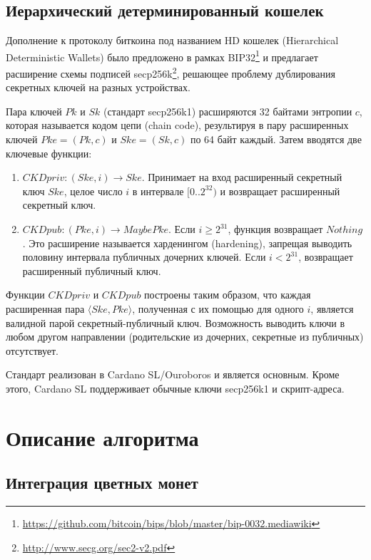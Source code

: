 \documentclass[]{itmo-student-thesis}
\begin{document}
\section{Иерархический детерминированный кошелек}

Дополнение к протоколу биткоина под названием HD кошелек (Hierarchical
Deterministic Wallets) было предложено в рамках
BIP32\footnote{\url{https://github.com/bitcoin/bips/blob/master/bip-0032.mediawiki}}
и предлагает расширение схемы подписей
secp256k\footnote{\url{http://www.secg.org/sec2-v2.pdf}}, решающее
проблему дублирования секретных ключей на разных устройствах.

Пара ключей $Pk$ и $Sk$ (стандарт secp256k1) расширяются 32 байтами
энтропии $c$, которая называется кодом цепи (chain code), результируя
в пару расширенных ключей $Pke = (Pk, c)$ и $Ske = (Sk, c)$ по 64 байт
каждый. Затем вводятся две ключевые функции:

\begin{enumerate}
\item $CKDpriv : (Ske, i) \rightarrow Ske$. Принимает на вход расширенный
  секретный ключ $Ske$, целое число $i$ в интервале $[0..2^{32})$ и
  возвращает расширенный секретный ключ.
\item $CKDpub : (Pke, i) \rightarrow Maybe Pke$. Если $i \geq 2^{31}$, функция
  возвращает $Nothing$. Это расширение называется харденингом
  (hardening), запрещая выводить половину интервала публичных дочерних
  ключей. Если $i < 2^{31}$, возвращает расширенный публичный ключ.
\end{enumerate}

Функции $CKDpriv$ и $CKDpub$ построены таким образом, что каждая
расширенная пара $\langle Ske,Pke \rangle$, полученная с их помощью для
одного $i$, является валидной парой секретный-публичный
ключ. Возможность выводить ключи в любом другом направлении
(родительские из дочерних, секретные из публичных) отсутствует.

Стандарт реализован в Cardano SL/Ouroboros и является основным. Кроме
этого, Cardano SL поддерживает обычные ключи secp256k1 и
скрипт-адреса.

\chapter{Описание алгоритма}

\section{Интеграция цветных монет}
\end{document}
